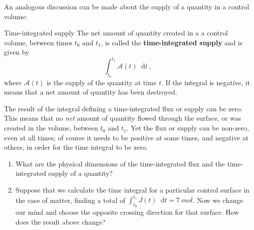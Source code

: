 \documentclass[a4paper,12pt,%
onecolumn,oneside,%
british%
]{memoir}
\newcommand*{\di}{\mathop{}\!\mathrm{d}}%
\renewcommand*{\|}[1][]{\nonscript\:#1\vert\nonscript\:\mathopen{}}
\newcommand*{\yti}{t_{0}}
\newcommand*{\ytf}{t_{1}}
\newcommand*{\dt}{\di t}
\newcommand*{\yJ}{J}
\newcommand*{\ya}{\mathcal{A}}
\begin{document}
\medskip

An analogous discussion can be made about the supply of a quantity in a control volume:
%
\begin{definition}{Time-integrated supply}
The net amount of quantity created in a a control volume, between times $\yti$ and $\ytf$, is called the \textbf{time-integrated supply} and is given by
  \begin{equation}
    \label{eq:total_supply_integral}
     \int_{\yti}^{\ytf}\!\! \ya(t)\dt\ ,
   \end{equation}
   where $\ya(t)$ is the supply of the quantity at time $t$. If the integral is negative, it means that a net amount of quantity has been destroyed.
 \end{definition}

 \medskip

\begin{warning}
  The result of the integral defining a time-integrated flux or supply can be zero. This means that no \emph{net} amount of quantity flowed through the surface, or was created in the volume, between $\yti$ and $\ytf$. Yet the flux or supply can be non-zero, even at all times; of course it needs to be positive at some times, and negative at others, in order for the time integral to be zero.
\end{warning}

\medskip

\begin{exercise}
  \begin{enumerate}[exerc]
  \item What are the physical dimensions of the time-integrated flux and the time-integrated supply of a quantity?
  \item Suppose that we calculate the time integral for a particular control surface in the case of matter, finding a total of $\int_{\yti}^{\ytf}\!\! \yJ(t)\dt = \qty{7}{mol}$. Now we change our mind and choose the opposite crossing direction for that surface. How does the result above change?
  \end{enumerate}
\end{exercise}
\end{document}
